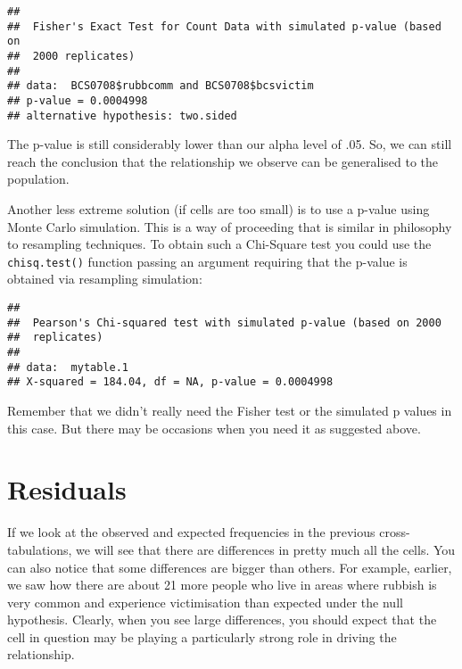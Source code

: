 \documentclass[
]{book}
\newenvironment{Shaded}{\begin{snugshade}}{\end{snugshade}}
\newcommand{\AttributeTok}[1]{\textcolor[rgb]{0.13,0.29,0.53}{#1}}
\newcommand{\ConstantTok}[1]{\textcolor[rgb]{0.56,0.35,0.01}{#1}}
\newcommand{\FloatTok}[1]{\textcolor[rgb]{0.00,0.00,0.81}{#1}}
\newcommand{\FunctionTok}[1]{\textcolor[rgb]{0.13,0.29,0.53}{\textbf{#1}}}
\newcommand{\NormalTok}[1]{#1}
\newcommand{\OtherTok}[1]{\textcolor[rgb]{0.56,0.35,0.01}{#1}}
\newcommand{\SpecialCharTok}[1]{\textcolor[rgb]{0.81,0.36,0.00}{\textbf{#1}}}
\begin{document}
\begin{verbatim}
## 
##  Fisher's Exact Test for Count Data with simulated p-value (based on
##  2000 replicates)
## 
## data:  BCS0708$rubbcomm and BCS0708$bcsvictim
## p-value = 0.0004998
## alternative hypothesis: two.sided
\end{verbatim}

The p-value is still considerably lower than our alpha level of .05. So, we can still reach the conclusion that the relationship we observe can be generalised to the population.

Another less extreme solution (if cells are too small) is to use a p-value using Monte Carlo simulation. This is a way of proceeding that is similar in philosophy to resampling techniques. To obtain such a Chi-Square test you could use the \texttt{chisq.test()} function passing an argument requiring that the p-value is obtained via resampling simulation:

\begin{Shaded}
\end{Shaded}

\begin{verbatim}
## 
##  Pearson's Chi-squared test with simulated p-value (based on 2000
##  replicates)
## 
## data:  mytable.1
## X-squared = 184.04, df = NA, p-value = 0.0004998
\end{verbatim}

Remember that we didn't really need the Fisher test or the simulated p values in this case. But there may be occasions when you need it as suggested above.

\section{Residuals}\label{residuals}

If we look at the observed and expected frequencies in the previous cross-tabulations, we will see that there are differences in pretty much all the cells. You can also notice that some differences are bigger than others. For example, earlier, we saw how there are about 21 more people who live in areas where rubbish is very common and experience victimisation than expected under the null hypothesis. Clearly, when you see large differences, you should expect that the cell in question may be playing a particularly strong role in driving the relationship.
\end{document}
